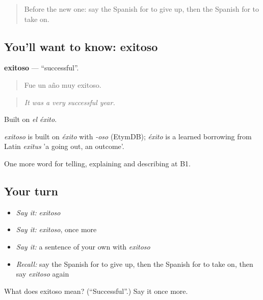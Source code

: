\label{lesson:ES-C639-exitoso}



\begin{quote}
Before the new one: say the Spanish for to give up, then the Spanish for to take on.
\end{quote}

\subsection*{You'll want to know: exitoso}
\textbf{exitoso} — \textquotedblleft{}successful\textquotedblright{}.

\begin{quote}
Fue un año muy exitoso.
\end{quote}

\begin{quote}
\emph{It was a very successful year.}
\end{quote}

Built on \emph{el éxito}.

\begin{cousinweb}
\emph{exitoso} is built on \emph{éxito} with \emph{-oso} (EtymDB); \emph{éxito} is a learned borrowing from Latin \emph{exitus} 'a going out, an outcome'.
\end{cousinweb}

\begin{grammarlens}[title={What you've built}]
One more word for telling, explaining and describing at B1.
\end{grammarlens}

\subsection*{Your turn}
\begin{itemize}
\raggedright
  \item \emph{Say it:} \emph{exitoso}
  \item \emph{Say it:} \emph{exitoso}, once more
  \item \emph{Say it:} a sentence of your own with \emph{exitoso}
  \item \emph{Recall:} say the Spanish for to give up, then the Spanish for to take on, then say \emph{exitoso} again
\end{itemize}

\begin{tcolorbox}[breakable,colback=teal!4,colframe=teal!35!black,title={Before you move on}]
What does exitoso mean? (\textquotedblleft{}Successful\textquotedblright{}.) Say it once more.
\end{tcolorbox}

